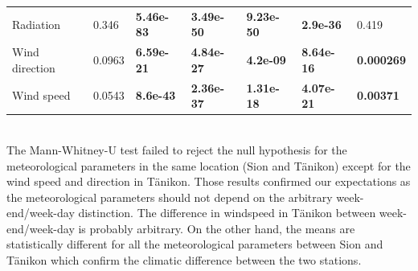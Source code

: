 \documentclass[a4paper, 12pt]{article}
\begin{document}
\begin{table}[b!]
{\begin{tabular}{@{}lllllll@{}}
            Radiation      & 0.346                                                                                        & \textbf{5.46e-83}                                                                            & \textbf{3.49e-50}                                                                            & \textbf{9.23e-50}                                                                            & \textbf{2.9e-36}                                                                             & 0.419                                                                                        \\
            Wind direction & 0.0963                                                                                       & \textbf{6.59e-21}                                                                            & \textbf{4.84e-27}                                                                            & \textbf{4.2e-09}                                                                             & \textbf{8.64e-16}                                                                            & \textbf{0.000269}                                                                            \\
            Wind speed     & 0.0543                                                                                       & \textbf{8.6e-43}                                                                             & \textbf{2.36e-37}                                                                            & \textbf{1.31e-18}                                                                            & \textbf{4.07e-21}                                                                            & \textbf{0.00371}                                                                             \\ \bottomrule
        \end{tabular}%
        }
    \end{table}
    \\
    The Mann-Whitney-U test failed to reject the null hypothesis for the meteorological parameters in the same location (Sion and Tänikon) except for the wind speed and direction in Tänikon. Those results confirmed our expectations as the meteorological parameters should not depend on the arbitrary week-end/week-day distinction. The difference in windspeed in Tänikon between week-end/week-day is probably arbitrary. On the other hand, the means are statistically different for all the meteorological parameters between Sion and Tänikon which confirm the climatic difference between the two stations. 
\end{document}
